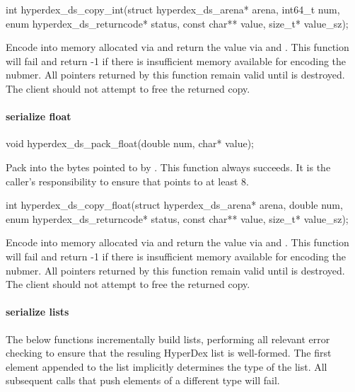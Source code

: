 \begin{ccode}
int hyperdex_ds_copy_int(struct hyperdex_ds_arena* arena, int64_t num,
                         enum hyperdex_ds_returncode* status,
                         const char** value, size_t* value_sz);
\end{ccode}
Encode  into memory allocated via  and return
the value via  and .  This function will fail and
return -1 if there is insufficient memory available for encoding the nubmer.
All pointers returned by this function remain valid until  is
destroyed.  The client should not attempt to free the returned copy.

\paragraph{serialize float}

\begin{ccode}
void hyperdex_ds_pack_float(double num, char* value);
\end{ccode}
Pack  into the bytes pointed to by .  This
function always succeeds.  It is the caller's responsibility to ensure that
 points to at least \unit{8}{\byte}.

\begin{ccode}
int hyperdex_ds_copy_float(struct hyperdex_ds_arena* arena, double num,
                           enum hyperdex_ds_returncode* status,
                           const char** value, size_t* value_sz);
\end{ccode}
Encode  into memory allocated via  and return
the value via  and .  This function will fail and
return -1 if there is insufficient memory available for encoding the nubmer.
All pointers returned by this function remain valid until  is
destroyed.  The client should not attempt to free the returned copy.

\paragraph{serialize lists}

The below functions incrementally build lists, performing all relevant error
checking to ensure that the resuling HyperDex list is well-formed.  The first
element appended to the list implicitly determines the type of the list.  All
subsequent calls that push elements of a different type will fail.

